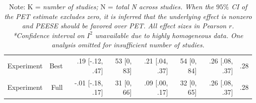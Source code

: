 \documentclass[man, mask]{apa6}
\begin{document}
\begin{table}[htbp]
\begin{tabular}{rrrrrrrr}
	    	Experiment & Best  &  .19 [-.12, .47] & 53 [0, 83] & .21 [.04, .37] & 54 [0, 84] & .26 [.08, .37] & .28 \\
	    	Experiment & Full  & -.01 [-.18, .17] & 31 [0, 66] & .09 [.00, .17] & 32 [0, 65] & .26 [.08, .37] & .28 \\
	    	\bottomrule
	    \end{tabular}%
	\label{table:adjustment}%
	\caption*{Note: K = {\em number of studies;} N = {\em total N across studies. When the $95\%$ CI of the PET estimate excludes zero, it is inferred that the underlying effect is nonzero and PEESE should be favored over PET. All effect sizes in Pearson $r$. *Confidence interval on $I^2$ unavailable due to highly homogeneous data. One analysis omitted for insufficient number of studies.}}
\end{table}%
\end{document}
